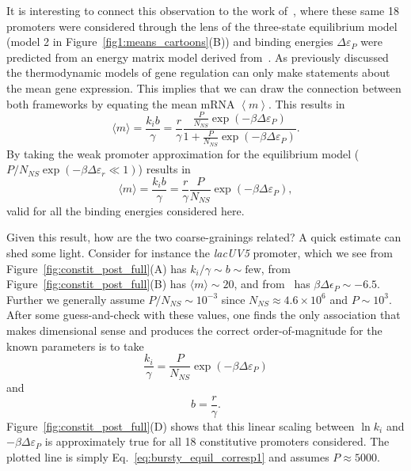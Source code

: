 It is interesting to connect this observation to the work
of~\cite{Brewster2012}, where these same 18 promoters were considered through
the lens of the three-state equilibrium model (model 2 in
Figure~\ref{fig1:means_cartoons}(B)) and binding energies $\Delta\varepsilon_P$
were predicted from an energy matrix model derived from~\cite{Kinney2010}. As
previously discussed the thermodynamic models of gene regulation can only make
statements about the mean gene expression. This implies that we can draw the
connection between both frameworks by equating the mean mRNA $\left\langle m \right\rangle$. This results in
\begin{equation}
\langle m \rangle = \frac{k_i b}{\gamma}
        = \frac{r}{\gamma}
        \frac{\frac{P}{N_{NS}}\exp(-\beta\Delta\varepsilon_P)}
                {1+\frac{P}{N_{NS}}\exp(-\beta\Delta\varepsilon_P)}.
\end{equation}
By taking the weak promoter approximation for the equilibrium model ($P/N_{NS} 
\exp(-\beta\Delta\varepsilon_r \ll 1)$) results in
\begin{equation}
\langle m \rangle = \frac{k_i b}{\gamma}
        = \frac{r}{\gamma} \frac{P}{N_{NS}}\exp(-\beta\Delta\varepsilon_P),
\end{equation}
valid for all the binding energies considered here.

Given this result, how are the two coarse-grainings related?
A quick estimate can shed some light.
Consider for instance the \textit{lacUV5} promoter, which we see from
Figure~\ref{fig:constit_post_full}(A) has $k_i/\gamma \sim b \sim \text{few}$,
from Figure~\ref{fig:constit_post_full}(B) has $\langle m \rangle \sim 20$,
and from~\cite{Brewster2012} has $\beta\Delta\epsilon_P \sim - 6.5$.
Further we generally assume $P/N_{NS} \sim 10^{-3}$ since
$N_{NS}\approx4.6\times10^6$ and $P\sim10^3$.
After some guess-and-check with these values, one finds the only
association that makes dimensional sense and produces the correct
order-of-magnitude for the known parameters is to take
\begin{equation}
\frac{k_i}{\gamma} = \frac{P}{N_{NS}} \exp(-\beta\Delta\varepsilon_P)
\label{eq:bursty_equil_corresp1}
\end{equation}
and
\begin{equation}
b = \frac{r}{\gamma}.
\label{eq:bursty_equil_corresp2}
\end{equation}
Figure~\ref{fig:constit_post_full}(D) shows that this linear scaling between
$\ln k_i$ and $-\beta\Delta\varepsilon_P$ is approximately true for all 18
constitutive promoters considered. The plotted line is simply
Eq.~\ref{eq:bursty_equil_corresp1} and assumes $P\approx 5000$.

